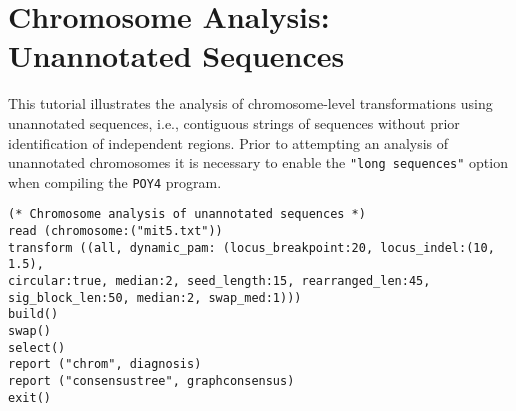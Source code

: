\section{Chromosome Analysis: Unannotated Sequences}{\label{tutorial 5}}

This tutorial illustrates the analysis of chromosome-level transformations using 
unannotated sequences, i.e., contiguous strings of sequences without prior 
identification of independent regions. Prior to attempting an analysis of  
unannotated chromosomes it is necessary to enable the \texttt {"long sequences"}
option when compiling the \texttt{POY4} program. 

\begin{verbatim}
(* Chromosome analysis of unannotated sequences *)
read (chromosome:("mit5.txt"))
transform ((all, dynamic_pam: (locus_breakpoint:20, locus_indel:(10, 1.5), 
circular:true, median:2, seed_length:15, rearranged_len:45,
sig_block_len:50, median:2, swap_med:1)))
build()
swap()
select()
report ("chrom", diagnosis)
report ("consensustree", graphconsensus)
exit()
\end{verbatim}



